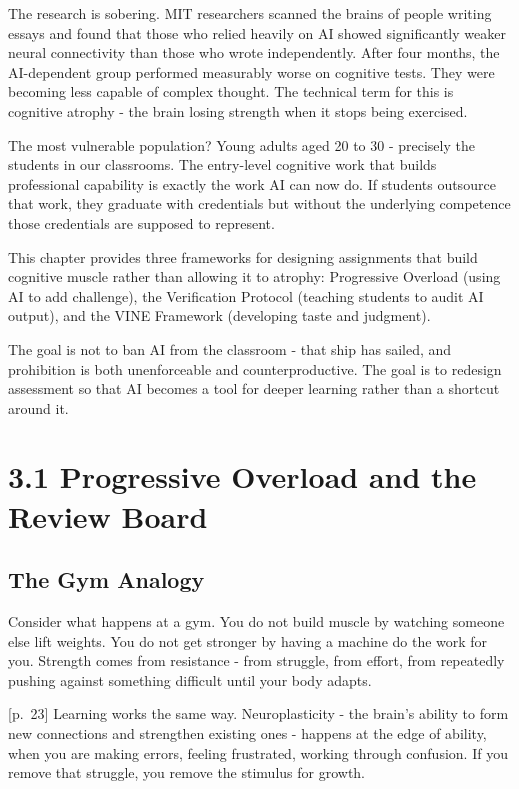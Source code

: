\documentclass[
  letterpaper,
  DIV=11,
  numbers=noendperiod]{scrreprt}
\begin{document}
The research is sobering. MIT researchers scanned the brains of people
writing essays and found that those who relied heavily on AI showed
significantly weaker neural connectivity than those who wrote
independently. After four months, the AI-dependent group performed
measurably worse on cognitive tests. They were becoming less capable of
complex thought. The technical term for this is cognitive atrophy - the
brain losing strength when it stops being exercised.

The most vulnerable population? Young adults aged 20 to 30 - precisely
the students in our classrooms. The entry-level cognitive work that
builds professional capability is exactly the work AI can now do. If
students outsource that work, they graduate with credentials but without
the underlying competence those credentials are supposed to represent.

This chapter provides three frameworks for designing assignments that
build cognitive muscle rather than allowing it to atrophy: Progressive
Overload (using AI to add challenge), the Verification Protocol
(teaching students to audit AI output), and the VINE Framework
(developing taste and judgment).

The goal is not to ban AI from the classroom - that ship has sailed, and
prohibition is both unenforceable and counterproductive. The goal is to
redesign assessment so that AI becomes a tool for deeper learning rather
than a shortcut around it.

\section{3.1 Progressive Overload and the Review
Board}\label{progressive-overload-and-the-review-board}

\subsection{The Gym Analogy}\label{the-gym-analogy}

Consider what happens at a gym. You do not build muscle by watching
someone else lift weights. You do not get stronger by having a machine
do the work for you. Strength comes from resistance - from struggle,
from effort, from repeatedly pushing against something difficult until
your body adapts.

{[}p.~23{]} Learning works the same way. Neuroplasticity - the brain's
ability to form new connections and strengthen existing ones - happens
at the edge of ability, when you are making errors, feeling frustrated,
working through confusion. If you remove that struggle, you remove the
stimulus for growth.
\end{document}

